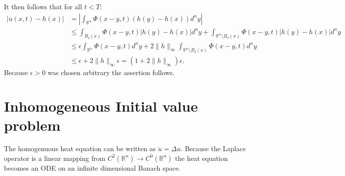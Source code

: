 \documentclass[A4,12pt,twoside]{book}
\begin{document}
{\[    \]
    It then follows that for all $ t < T$:
    \begin{align*}
        |u(x,t) - h(x) | &= \left| \int_{\mathbb{R}^n} \Phi (x-y,t) (h(y) - h(x)) d^n y \right| \\
        & \leq \int_{ B_\delta (x) }  \Phi (x-y,t) \left|h(y) - h(x)\right|  d^n y +\int_{\mathbb{R}^n \setminus B_\delta (x) }\Phi (x-y,t) \left|h(y) - h(x)\right|  d^n y  \\
        & \leq \epsilon \int_{\mathbb{R}^n} \Phi (x-y,t) d^n y + 2 \| h \|_\infty \int_{\mathbb{R}^n \setminus B_\delta (x) }\Phi (x-y,t)  d^n y \\
        &\leq \epsilon + 2 \| h \|_\infty \epsilon = (1 + 2 \| h \|_\infty ) \epsilon.
    \end{align*}
    Because $\epsilon >0$ was chosen arbitrary the assertion follows.
}

\section{Inhomogeneous Initial value problem}
The homogenuous heat equation can be written as $\dot{u} = \Delta u$. Because the Laplace operator is a linear mapping from $C^2( \mathbb{R}^n) \to C^0 (\mathbb{R}^n)$ the heat equation becomes an ODE on an infinite dimensional Banach space. 
\end{document}
